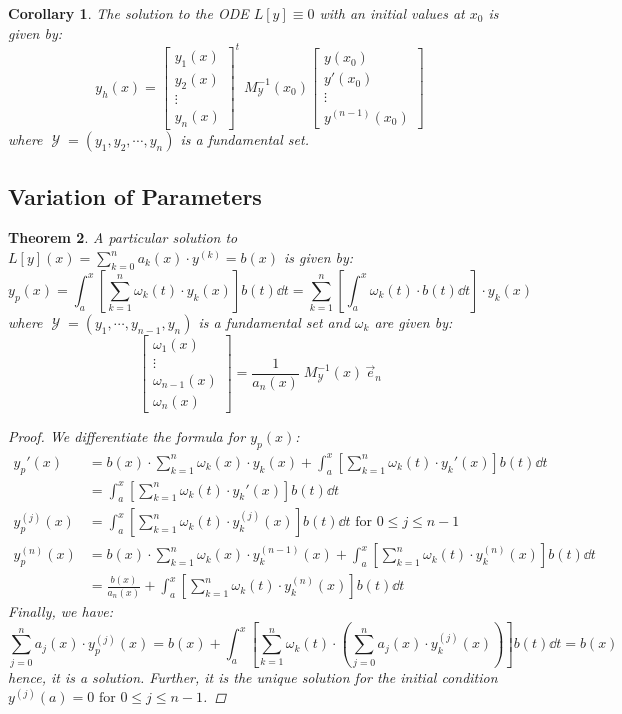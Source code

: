 \documentclass[12pt]{article}
\DeclareMathOperator{\Y}{\mathcal{Y}}
\newcommand{\der}[2][n]{{#2}^{(#1)}}
\newtheorem{theorem}{Theorem}[subsection]
\newtheorem{corollary}[theorem]{Corollary}
\begin{document}
\begin{corollary}
  \label{initial_value}
  The solution to the ODE $L[y]\equiv 0$ with an initial values at $x_0$ is given by:
  $$y_h(x)=\begin{bmatrix}
    y_1(x) \\ y_2(x) \\\vdots\\ y_n(x)
  \end{bmatrix}^t\;M^{-1}_{\Y}(x_0)\begin{bmatrix}
    y(x_0)\\y'(x_0)\\\vdots\\\der[n-1]{y}(x_0)
  \end{bmatrix}$$
  where $\Y=(y_1,y_2,\cdots,y_n)$ is a fundamental set.
\end{corollary}

\pagebreak

\subsection{Variation of Parameters}

\begin{theorem}
  \label{particular_solution}
  A particular solution to $L[y](x)=\sum_{k=0}^n a_k(x)\cdot\der[k]{y}=b(x)$ is given by: $$y_p(x)=\int_a^x\left[\sum_{k=1}^n \omega_k(t)\cdot y_k(x)\right]b(t)\dd{t}=\sum_{k=1}^n \left[\int_a^x \omega_k(t)\cdot b(t)\dd{t}\right]\cdot y_k(x)$$
  where $\Y=(y_1,\cdots,y_{n-1},y_n)$ is a fundamental set and $\omega_k$ are given by: $$\begin{bmatrix}
    \omega_1(x) \\\vdots\\ \omega_{n-1}(x) \\ \omega_n(x)
  \end{bmatrix}=\frac{1}{a_n(x)}\;M^{-1}_{\Y}(x)\,\vec{e}_n$$
  \begin{proof}
    We differentiate the formula for $y_p(x)$:
    \begin{align*}
      y_p'(x)&=b(x)\cdot\sum_{k=1}^n \omega_k(x)\cdot y_k(x)+\int_a^x\left[\sum_{k=1}^n \omega_k(t)\cdot y_k'(x)\right]b(t)\dd{t}\\
      &=\int_a^x\left[\sum_{k=1}^n \omega_k(t)\cdot y_k'(x)\right]b(t)\dd{t}\\
      \der[j]{y}_p(x)&=\int_a^x\left[\sum_{k=1}^n \omega_k(t)\cdot \der[j]{y}_k(x)\right]b(t)\dd{t}\text{ for }0\leq j\leq n-1\\
      \der{y}_p(x)&=b(x)\cdot\sum_{k=1}^n \omega_k(x)\cdot\der[n-1]{y}_k(x)+\int_a^x\left[\sum_{k=1}^n \omega_k(t)\cdot\der{y}_k(x)\right]b(t)\dd{t}\\
      &=\frac{b(x)}{a_n(x)}+\int_a^x\left[\sum_{k=1}^n \omega_k(t)\cdot\der{y}_k(x)\right]b(t)\dd{t}
    \end{align*}
    Finally, we have: $$\sum_{j=0}^n a_j(x)\cdot \der[j]{y}_p(x)=b(x)+\int_a^x\left[\sum_{k=1}^n \omega_k(t)\cdot\left(\sum_{j=0}^n a_j(x)\cdot\der[j]{y}_k(x)\right)\right]b(t)\dd{t}=b(x)$$ hence, it is a solution. Further, it is the unique solution for the initial condition $\der[j]{y}(a)=0\text{ for }0\leq j\leq n-1$.
  \end{proof}
\end{theorem}
\end{document}
